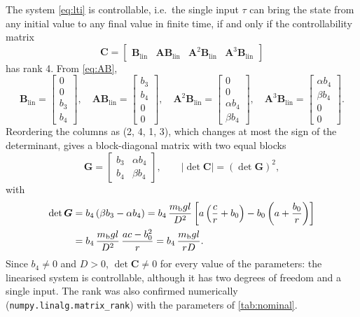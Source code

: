 The system \cref{eq:lti} is controllable, i.e.\ the single input $\tau$ can
bring the state from any initial value to any final value in finite time, if
and only if the controllability matrix
\begin{equation}
  \bm C = \begin{bmatrix} \bm B_{\mathrm{lin}} & \bm A\bm B_{\mathrm{lin}} & \bm A^2\bm B_{\mathrm{lin}} & \bm A^3\bm B_{\mathrm{lin}} \end{bmatrix}
\end{equation}
has rank 4. From \cref{eq:AB},
\begin{equation}
  \bm B_{\mathrm{lin}} = \begin{bmatrix} 0 \\ 0 \\ b_3 \\ b_4 \end{bmatrix},\quad
  \bm A\bm B_{\mathrm{lin}} = \begin{bmatrix} b_3 \\ b_4 \\ 0 \\ 0 \end{bmatrix},\quad
  \bm A^2\bm B_{\mathrm{lin}} = \begin{bmatrix} 0 \\ 0 \\ \alpha b_4 \\ \beta b_4 \end{bmatrix},\quad
  \bm A^3\bm B_{\mathrm{lin}} = \begin{bmatrix} \alpha b_4 \\ \beta b_4 \\ 0 \\ 0 \end{bmatrix}.
\end{equation}
Reordering the columns as (2, 4, 1, 3), which changes at most the sign of the
determinant, gives a block-diagonal matrix with two equal blocks
\begin{equation}
  \bm G = \begin{bmatrix} b_3 & \alpha b_4 \\ b_4 & \beta b_4 \end{bmatrix},
  \qquad |\det\bm C| = (\det\bm G)^2 ,
\end{equation}
with
\begin{equation}
\begin{aligned}
  \det\bm G &= b_4\left(\beta b_3 - \alpha b_4\right)
  = b_4\,\frac{m_{\mathrm b} g l}{D^2}\left[a\left(\frac{c}{r} + b_0\right) - b_0\left(a + \frac{b_0}{r}\right)\right] \\
  &= b_4\,\frac{m_{\mathrm b} g l}{D^2}\,\frac{ac - b_0^2}{r}
  = b_4\,\frac{m_{\mathrm b} g l}{r D} .
\end{aligned}
\end{equation}
Since $b_4 \neq 0$ and $D > 0$, $\det\bm C \neq 0$ for every value of the
parameters: the linearised system is controllable, although it has two degrees
of freedom and a single input. The rank was also confirmed numerically
(\texttt{numpy.linalg.matrix\_rank}) with the parameters of \cref{tab:nominal}.
